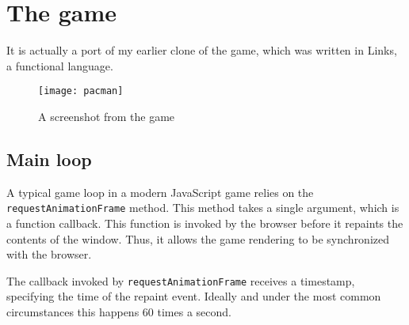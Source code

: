 \section{The game}
It is actually a port of my earlier clone of the game, which was written in
Links\cite{links_site}, a functional language.

\begin{figure}[h!]
\centering \texttt{[image: pacman]}
\caption{A screenshot from the game}
\label{fig:pacman}
\end{figure}

\subsection{Main loop}
A typical game loop in a modern JavaScript
game\cite{mdn_game_anatomy}
relies on the \texttt{requestAnimationFrame}
method\cite{mdn_requestanimationframe}. This
method takes a single argument, which is a function callback. This function is
invoked by the browser before it repaints the contents of the window. Thus, it
allows the game rendering to be synchronized with the browser.

The callback invoked by \texttt{requestAnimationFrame} receives a timestamp,
specifying the time of the repaint event. Ideally and under the most common
circumstances this happens 60 times a second.

